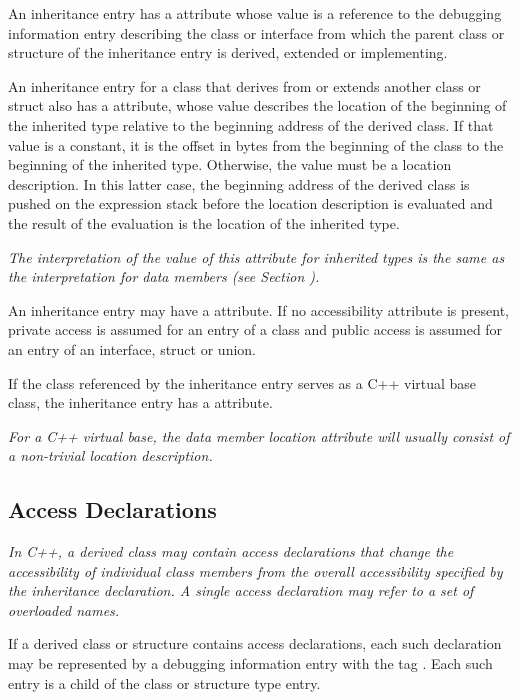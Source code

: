 An inheritance entry has a  attribute whose value is
a reference to the debugging information entry describing the
class or interface from which the parent class or structure
of the inheritance entry is derived, extended or implementing.

An inheritance entry for a class that derives from or extends
another class or struct also has a 
attribute, whose value describes the location of the beginning
of the inherited type relative to the beginning address of the
derived class. If that value is a constant, it is the offset
in bytes from the beginning of the class to the beginning of
the inherited type. Otherwise, the value must be a location
description. In this latter case, the beginning address of
the derived class is pushed on the expression stack before
the location description is evaluated and the result of the
evaluation is the location of the inherited type.

\textit{The interpretation of the value of this attribute for
inherited types is the same as the interpretation for data
members 
(see Section ).  }

An inheritance entry may have a
 attribute. If no accessibility attribute
is present, private access is assumed for an entry of a class
and public access is assumed for an entry of an interface,
struct or union.

If the class referenced by the inheritance entry serves
as a C++ virtual base class, the inheritance entry has a
 attribute.

\textit{For a C++ virtual base, the data member location attribute
will usually consist of a non-trivial location description.}

\subsection{Access Declarations}
\label{chap:accessdeclarations}

\textit{In C++, a derived class may contain access declarations that
change the accessibility of individual class members from the
overall accessibility specified by the inheritance declaration.
A single access declaration may refer to a set of overloaded
names.}

If a derived class or structure contains access declarations,
each such declaration may be represented by a debugging
information entry with the tag 
. 
Each
such entry is a child of the class or structure type entry.

